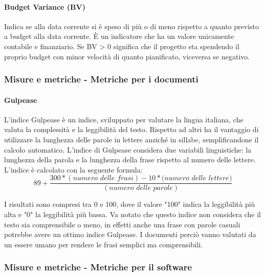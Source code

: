 \documentclass[12pt,a4paper,titlepage]{article}
\begin{document}
			\paragraph{Budget Variance (BV)}
			Indica se alla data corrente si è speso di più o di meno rispetto a quanto previsto a budget alla data corrente. È un indicatore che ha un valore unicamente contabile e finanziario. Se BV > 0 significa che il progetto sta spendendo il proprio budget con minor velocità di quanto pianificato, viceversa se negativo. \\
		
		\subsubsection{Misure e metriche - Metriche per i documenti}
			\paragraph{Gulpease}
			L'indice Gulpease è un indice, sviluppato per valutare la lingua italiana, che valuta la complessità e la leggibilità del testo. Rispetto ad altri ha il vantaggio di utilizzare la lunghezza delle parole in lettere anziché in sillabe, semplificandone il calcolo automatico. L'indice di Gulpease considera due variabili linguistiche: la lunghezza della parola e la lunghezza della frase rispetto al numero delle lettere.\\
			L'indice è calcolato con la seguente formula:
			\[89+\frac{300*(\textit{numero delle frasi})-10*(\textit{numero delle lettere)}}{(\textit{numero delle parole})}\]
			
			I risultati sono compresi tra 0 e 100, dove il valore "100" indica la leggibilità più alta e "0" la leggibilità più bassa. 
			Va notato che questo indice non considera che il testo sia comprensibile o meno, in effetti anche una frase con parole casuali potrebbe avere un ottimo indice Gulpease. I documenti perciò vanno valutati da un essere umano per rendere le frasi semplici ma comprensibili.\\
		
			\subsubsection{Misure e metriche - Metriche per il software}
			
\end{document}
